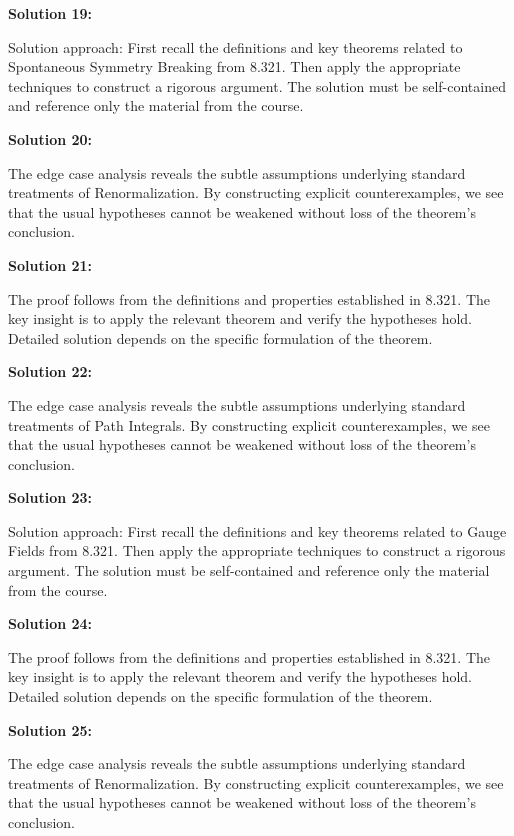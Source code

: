 \documentclass[12pt,a4paper]{exam}
\begin{document}
\vspace{0.5cm}

\textbf{Solution 19:}

Solution approach: First recall the definitions and key theorems related to Spontaneous Symmetry Breaking from 8.321. Then apply the appropriate techniques to construct a rigorous argument. The solution must be self-contained and reference only the material from the course.

\vspace{0.5cm}

\textbf{Solution 20:}

The edge case analysis reveals the subtle assumptions underlying standard treatments of Renormalization. By constructing explicit counterexamples, we see that the usual hypotheses cannot be weakened without loss of the theorem's conclusion.

\vspace{0.5cm}

\textbf{Solution 21:}

The proof follows from the definitions and properties established in 8.321. The key insight is to apply the relevant theorem and verify the hypotheses hold. Detailed solution depends on the specific formulation of the theorem.

\vspace{0.5cm}

\textbf{Solution 22:}

The edge case analysis reveals the subtle assumptions underlying standard treatments of Path Integrals. By constructing explicit counterexamples, we see that the usual hypotheses cannot be weakened without loss of the theorem's conclusion.

\vspace{0.5cm}

\textbf{Solution 23:}

Solution approach: First recall the definitions and key theorems related to Gauge Fields from 8.321. Then apply the appropriate techniques to construct a rigorous argument. The solution must be self-contained and reference only the material from the course.

\vspace{0.5cm}

\textbf{Solution 24:}

The proof follows from the definitions and properties established in 8.321. The key insight is to apply the relevant theorem and verify the hypotheses hold. Detailed solution depends on the specific formulation of the theorem.

\vspace{0.5cm}

\textbf{Solution 25:}

The edge case analysis reveals the subtle assumptions underlying standard treatments of Renormalization. By constructing explicit counterexamples, we see that the usual hypotheses cannot be weakened without loss of the theorem's conclusion.

\vspace{0.5cm}
\end{document}
